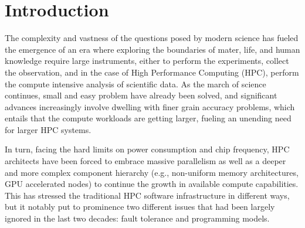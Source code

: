 \documentclass[sigconf]{acmart}
\begin{document}

%

%
\maketitle

\section{Introduction}

The complexity and vastness of the questions posed by modern science has
fueled the emergence of an era where exploring the boundaries of mater, life,
and human knowledge require large instruments, either to perform the
experiments, collect the observation, and in the
case of High Performance Computing (HPC), perform the compute intensive
analysis of scientific data. As the march of science continues, small and
easy problem have already been solved, and significant advances increasingly
involve dwelling with finer grain accuracy problems, which entails that the
compute workloads are getting larger, fueling an unending need for larger
HPC systems.

In turn, facing the hard limits on power consumption and chip frequency,
HPC architects have been forced to embrace massive parallelism as well as
a deeper and more complex component hierarchy (e.g., non-uniform memory architectures,
GPU accelerated nodes) to continue the growth in available compute capabilities.
This has stressed the traditional HPC software infrastructure in different 
ways, but it notably put to prominence two different issues that had been 
largely ignored in the last two decades: fault tolerance and programming 
models.
\end{document}
